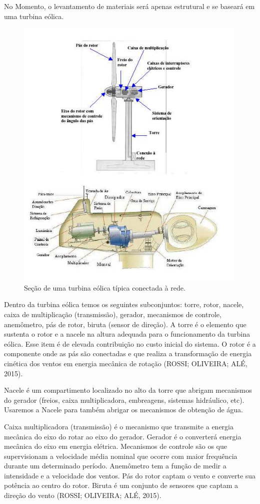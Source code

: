 \documentclass[12pt,openright,oneside,a4paper,brazil]{abntex2}
\begin{document}
No Momento, o levantamento de materiais será apenas estrutural e se baseará em uma turbina eólica.

\begin{figure}[!htbp]
\centering
\includegraphics[scale=0.80]{turbina}
\caption[Caption title in LOF]{Seção de uma turbina eólica típica conectada à rede.\footnotemark}
\FloatBarrier
\label{Max_Water}
\end{figure}

Dentro da turbina eólica temos os seguintes subconjuntos: torre, rotor, nacele, caixa de multiplicação (transmissão), gerador, mecanismos de controle, anemômetro, pás de rotor, biruta (sensor de direção). A torre é o elemento que sustenta o rotor e a nacele na altura adequada para o funcionamento da turbina eólica. Esse item é de elevada contribuição no custo inicial do sistema. O rotor é a componente onde as pás são conectadas e que realiza a transformação de energia cinética dos ventos em energia mecânica de rotação (ROSSI; OLIVEIRA; ALÉ, 2015).

	Nacele é um compartimento localizado no alto da torre que abrigam mecanismos do gerador (freios, caixa multiplicadora, embreagens, sistemas hidráulico, etc). Usaremos a Nacele para também abrigar os mecanismos de obtenção de água. 
	
	Caixa multiplicadora (transmissão) é o mecanismo que transmite a energia mecânica do eixo do rotar ao eixo do gerador. Gerador é o converterá energia mecânica do eixo em energia elétrica. Mecanismos de controle são os que supervisionam a velocidade média nominal que ocorre com maior frequência durante um determinado período. Anemômetro tem a função de medir a intensidade e a velocidade dos ventos. Pás do rotor captam o vento e converte sua potência ao centro do rotor. Biruta é um conjunto de sensores que captam a direção do vento (ROSSI; OLIVEIRA; ALÉ, 2015).
	
\end{document}
